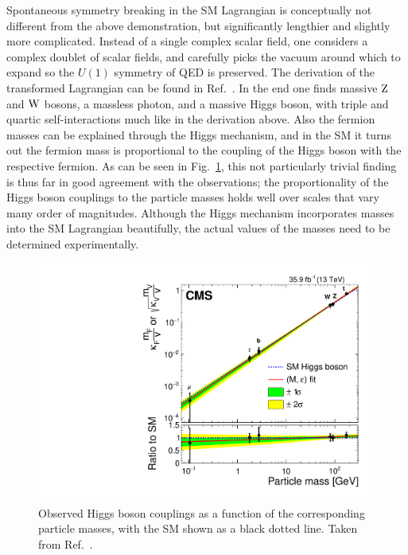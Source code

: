Spontaneous symmetry breaking in the SM Lagrangian is conceptually not different from the above demonstration, but significantly lengthier and slightly more complicated.
% 
Instead of a single complex scalar field, one considers a complex doublet of scalar fields, and carefully picks the vacuum around which to expand so the $U(1)$ symmetry of QED is preserved.
% 
The derivation of the transformed Lagrangian can be found in Ref.~\cite{Djouadi:2005gi}.
% 
In the end one finds massive $\mathrm{Z}$ and $\mathrm{W}$ bosons, a massless photon, and a massive Higgs boson, with triple and quartic self-interactions much like in the derivation above.
% 
Also the fermion masses can be explained through the Higgs mechanism, and in the SM it turns out the fermion mass is proportional to the coupling of the Higgs boson with the respective fermion.
% 
As can be seen in Fig.~\ref{fig:massproportion}, this not particularly trivial finding is thus far in good agreement with the observations; the proportionality of the Higgs boson couplings to the particle masses holds well over scales that vary many order of magnitudes.
% 
Although the Higgs mechanism incorporates masses into the SM Lagrangian beautifully, the actual values of the masses need to be determined experimentally.


\begin{figure}[hbtp]
  \begin{center}
    \includegraphics[width=\halflinewidth]{img/theory/grandcomb/massproportion.pdf}
    \caption{
        Observed Higgs boson couplings as a function of the corresponding particle masses, with the SM shown as a black dotted line.
        Taken from Ref.~\cite{Sirunyan:2018koj}.
        }
    \label{fig:massproportion}
  \end{center}
\end{figure}


